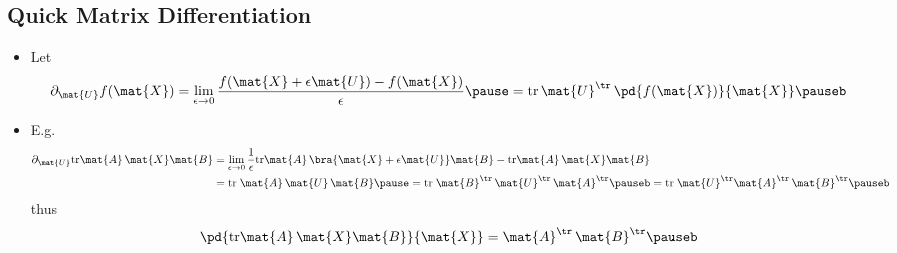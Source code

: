 \begin{slide}
\section[-2]{Quick Matrix Differentiation}

\begin{PauseHighLight}
  \begin{itemize}
  \item Let
    \begin{align*}
      \partial_{\mat{U}} f(\mat{X}) = \lim_{\epsilon\rightarrow0}
      \frac{f(\mat{X}+\epsilon \mat{U}) - f(\mat{X})}{\epsilon}\pause
      = \mathrm{tr}\,  \mat{U}^\tr \,  \pd{f(\mat{X})}{\mat{X}}\pauseb
    \end{align*}
  \item E.g.
    \begin{align*}
      \partial_{\mat{U}} \mathrm{tr} \mat{A} \, \mat{X} \mat{B}
      &=  \lim_{\epsilon\rightarrow0} \frac{1}{\epsilon}  \mathrm{tr}
        \mat{A} \, \bra{\strut \mat{X} + \epsilon \mat{U}} \mat{B} -
        \mathrm{tr} \mat{A} \, \mat{X} \mat{B} \\
      &= \mathrm{tr}\; \mat{A} \, \mat{U} \, \mat{B}\pause
      = \mathrm{tr} \;\mat{B}^\tr \, \mat{U}^\tr \, \mat{A}^\tr\pauseb
      = \mathrm{tr} \; \mat{U}^\tr \mat{A}^\tr\, \mat{B}^\tr \pauseb
    \end{align*}
    thus
    \begin{align*}
      \pd{ \mathrm{tr} \mat{A} \, \mat{X} \mat{B} }{\mat{X}} =  \mat{A}^\tr\, \mat{B}^\tr \pauseb
    \end{align*}
  \end{itemize}
\end{PauseHighLight}

\end{slide}



